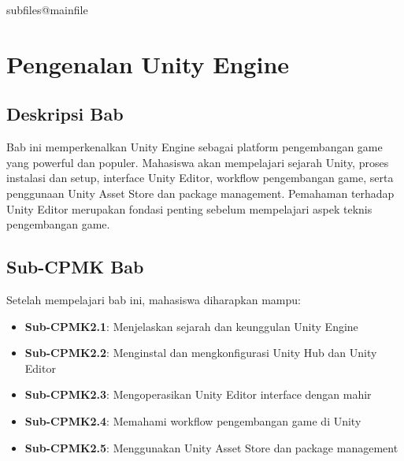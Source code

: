 \documentclass[../../main.tex]{subfiles}
\begin{document}
\ifcsname subfiles@mainfile\endcsname\else
    \setcounter{chapter}{1}
\fi
\chapter{Pengenalan Unity Engine}

\section{Deskripsi Bab}

Bab ini memperkenalkan Unity Engine sebagai platform pengembangan game yang powerful dan populer. Mahasiswa akan mempelajari sejarah Unity, proses instalasi dan setup, interface Unity Editor, workflow pengembangan game, serta penggunaan Unity Asset Store dan package management. Pemahaman terhadap Unity Editor merupakan fondasi penting sebelum mempelajari aspek teknis pengembangan game.

\section{Sub-CPMK Bab}

Setelah mempelajari bab ini, mahasiswa diharapkan mampu:
\begin{itemize}
\item \textbf{Sub-CPMK2.1}: Menjelaskan sejarah dan keunggulan Unity Engine
\item \textbf{Sub-CPMK2.2}: Menginstal dan mengkonfigurasi Unity Hub dan Unity Editor
\item \textbf{Sub-CPMK2.3}: Mengoperasikan Unity Editor interface dengan mahir
\item \textbf{Sub-CPMK2.4}: Memahami workflow pengembangan game di Unity
\item \textbf{Sub-CPMK2.5}: Menggunakan Unity Asset Store dan package management
\end{itemize}









\end{document}
